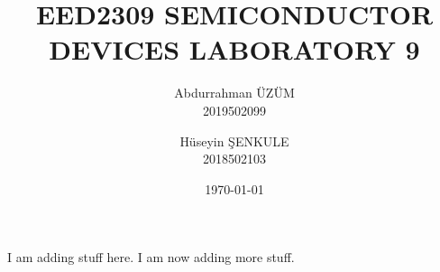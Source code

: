 \documentclass[12pt, a4paper]{article}
\title{EED2309 SEMICONDUCTOR DEVICES LABORATORY 9}
\author{Abdurrahman ÜZÜM\\2019502099 \and Hüseyin ŞENKULE\\2018502103}
\date{\today}
\begin{document}
    \maketitle

    I am adding stuff here. I am now adding more stuff.
 
    

    \pagebreak
    
    

    \pagebreak
    
    
\end{document}

